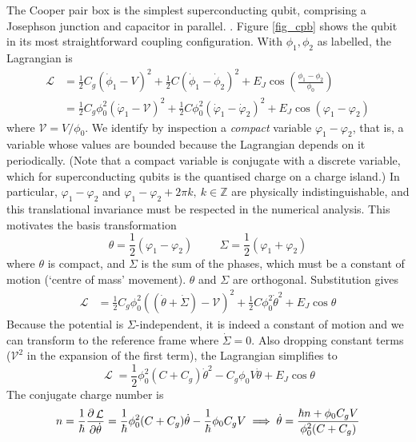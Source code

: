 \documentclass[11pt]{article}
\DeclareMathOperator{\lagr}{\mathcal{L}}
\begin{document}
The Cooper pair box is the simplest superconducting qubit, comprising a Josephson junction and capacitor in parallel. \cite{girvin2011superconducting}. Figure \ref{fig_cpb} shows the qubit in its most straightforward coupling configuration. With $\phi_1, \phi_2$ as labelled, the Lagrangian is
\begin{align}
\lagr 
&= \frac{1}{2} C_g (\dot{\phi}_1 - V)^2 + \frac{1}{2} C (\dot{\phi}_1 - \dot{\phi}_2)^2 + E_J \cos{\left(\frac{\phi_1 - \phi_2}{\phi_0}\right)} \\
&= \frac{1}{2} C_g \phi_0^2 \left(\dot{\varphi}_1 - \mathcal{V}\right)^2 + \frac{1}{2} C \phi_0^2 (\dot{\varphi}_1 - \dot{\varphi}_2)^2 + E_J \cos{(\varphi_1 - \varphi_2)}
\end{align}
where $\mathcal{V} = V / \phi_0$. We identify by inspection a \emph{compact} variable $\varphi_1-\varphi_2$, that is, a variable whose values are bounded because the Lagrangian depends on it periodically. (Note that a compact variable is conjugate with a discrete variable, which for superconducting qubits is the quantised charge on a charge island.) In particular, $\varphi_1-\varphi_2$ and $\varphi_1-\varphi_2+2\pi k, \ k \in \mathbb{Z}$ are physically indistinguishable, and this translational invariance must be respected in the numerical analysis. This motivates the basis transformation
\begin{equation}
\theta = \frac{1}{2} (\varphi_1 - \varphi_2)
\hspace{1cm}
\Sigma = \frac{1}{2} (\varphi_1 + \varphi_2)
\end{equation}
where $\theta$ is compact, and $\Sigma$ is the sum of the phases, which must be a constant of motion (`centre of mass' movement). $\theta$ and $\Sigma$ are orthogonal. Substitution gives
\begin{align}
\lagr 
&= \frac{1}{2} C_g \phi_0^2 \left((\dot{\theta} + \dot{\Sigma}) - \mathcal{V}\right)^2 + \frac{1}{2} C \phi_0^2 \dot{\theta}^2 + E_J \cos{\theta}
\end{align}
Because the potential is $\Sigma$-independent, it is indeed a constant of motion and we can transform to the reference frame where $\dot{\Sigma}=0$. Also dropping constant terms ($\mathcal{V}^2$ in the expansion of the first term), the Lagrangian simplifies to
\begin{equation}
\lagr = \frac{1}{2} \phi_0^2 (C + C_g) \dot{\theta}^2 - C_g \phi_0 V \dot{\theta} + E_J \cos{\theta}
\end{equation}
The conjugate charge number is
\begin{equation}
n 
= \frac{1}{\hbar} \pdv{\lagr}{\dot{\theta}}
= \frac{1}{\hbar} \phi_0^2 (C + C_g) \dot{\theta} - \frac{1}{\hbar} \phi_0 C_g V
\implies
\dot{\theta} = \frac{\hbar n + \phi_0 C_g V}{\phi_0^2 (C + C_g)}
\end{equation}
\end{document}
